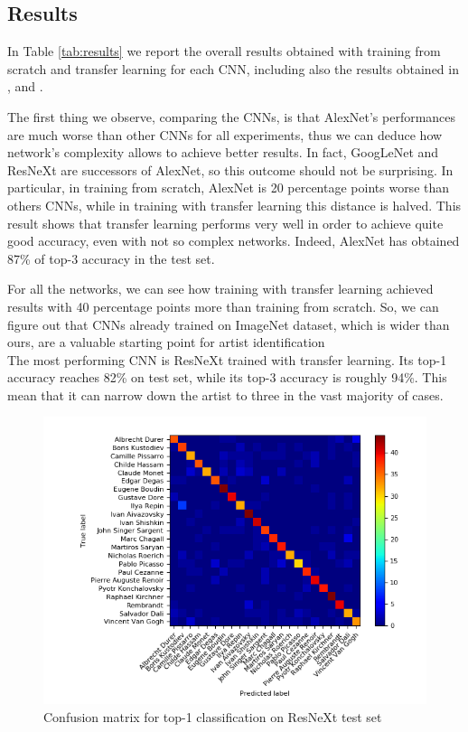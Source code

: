 \documentclass{article}
\begin{document}
\subsection{Results}\label{results}

In Table \ref{tab:results} we report the overall results obtained with training  from scratch and transfer learning for each CNN, including also the results obtained in \cite{ArtistIdCNN406}, \cite{Saleh2015} and \cite{mensink2014}.

The first thing we observe, comparing the CNNs, is that AlexNet's performances are much worse than other CNNs for all experiments, thus we can deduce how network's complexity allows to achieve better results. In fact, GoogLeNet and ResNeXt are successors of AlexNet, so this outcome should not be surprising. 
In particular, in training from scratch, AlexNet is 20 percentage points worse than others CNNs, while in training with transfer learning this distance is halved. This result shows that transfer learning performs very well in order to achieve quite good accuracy, even with not so complex networks. Indeed, AlexNet has obtained 87\% of top-3 accuracy in the test set.

For all the networks, we can see how training with transfer learning achieved results with 40 percentage points more than training from scratch. So, we can figure out that CNNs already trained on ImageNet dataset, which is wider than ours,  are a valuable starting point for artist identification\\
The most performing CNN is ResNeXt trained with transfer learning. Its top-1 accuracy reaches 82\% on test set, while its top-3 accuracy is roughly 94\%. This mean that it can narrow down the artist to three in the vast majority of cases.

\begin{figure}[t]
	\centering
	\includegraphics[width=0.8\linewidth]{graphs/confusion}
	\caption{Confusion matrix for top-1 classification on ResNeXt test set}
	\label{fig:confusion}
\end{figure}
\end{document}
